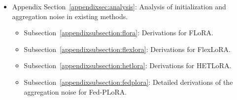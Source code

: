 \documentclass{article} %
\begin{document}
\begin{itemize}
\begin{itemize}
            \item Subsection~\ref{appendixsection:ablexps}: Ablation studies.
                \begin{itemize}
                    \item Subsection~\ref{appendixsubsection:selection}: Effectiveness of different selection methods for PLoRA modules.
                    \item Subsection~\ref{appendixsubsection:init_agg_observation}: Empirical observations on initialization and aggregation noise.
                    \item Subsection~\ref{appendixsubsection:num_ratio}: Impact of the number of clients, heterogeneity ratio, and local rank per client.
                    \item Subsection~\ref{appendixsubsection:plora_rank}: Effects of different PLoRA ranks.
                    \item Subsection~\ref{appendixsubsection:dropout}: Effects of Dropout.
                    \item Subsection~\ref{appendixsubsection:vis_cos_sim}: Additional visualizations of cosine similarity across PLoRA modules.
                \end{itemize}
        \end{itemize}
                



    \item Appendix Section~\ref{appendixsec:analysis}: Analysis of initialization and aggregation noise in existing methods.
        \begin{itemize}
            \item Subsection~\ref{appendixsubsection:flora}: Derivations for FLoRA.
            \item Subsection~\ref{appendixsubsection:flexlora}: Derivations for FlexLoRA.
            \item Subsection~\ref{appendixsubsection:hetlora}: Derivations for HETLoRA.
            \item  Subsection~\ref{appendixsubsection:fedplora}: Detailed derivations of the aggregation noise for Fed-PLoRA.
        \end{itemize}


\end{itemize}
\end{document}
